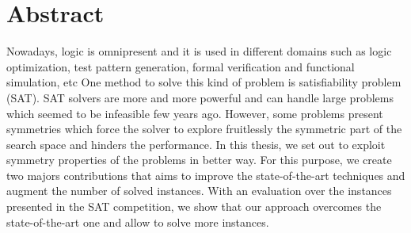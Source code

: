 
\chapter*{Abstract}
Nowadays, logic is omnipresent and it is used in different domains such as logic optimization, test pattern generation, formal verification and functional simulation, etc
One method to solve this kind of problem is satisfiability problem (SAT).
SAT solvers are more and more powerful and can handle large problems which seemed to be infeasible 
few years ago. However, some problems present symmetries which force the solver to explore fruitlessly
the symmetric part of the search space and hinders the performance. 
In this thesis, we set out to exploit symmetry properties of the problems in better way.
For this purpose, we create two majors contributions that aims to improve the state-of-the-art techniques and augment the number of solved instances. With an evaluation over the instances presented in the SAT competition, we show that our approach overcomes the state-of-the-art one and allow to solve more instances. 